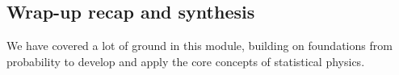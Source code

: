 \subsection{Wrap-up recap and synthesis}
We have covered a lot of ground in this module, building on foundations from probability to develop and apply the core concepts of statistical physics.




